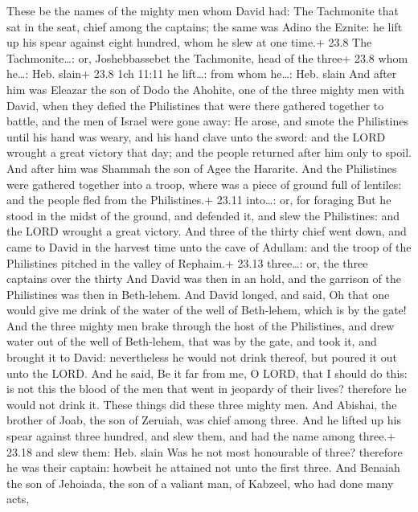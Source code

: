  These be the names of the mighty men whom David had: The
Tachmonite that sat in the seat, chief among the captains; the same was
Adino the Eznite: he lift up his spear against eight hundred, whom he
slew at one time.+ 23.8 The Tachmonite\ldots: or, Joshebbassebet the
Tachmonite, head of the three+ 23.8 whom he\ldots: Heb. slain+ 23.8 1ch
11:11 he lift\ldots: from whom he\ldots: Heb. slain  And
after him was Eleazar the son of Dodo the Ahohite, one of the three
mighty men with David, when they defied the Philistines that were there
gathered together to battle, and the men of Israel were gone away:
 He arose, and smote the Philistines until his hand was
weary, and his hand clave unto the sword: and the LORD wrought a great
victory that day; and the people returned after him only to spoil.
 And after him was Shammah the son of Agee the Hararite.
And the Philistines were gathered together into a troop, where was a
piece of ground full of lentiles: and the people fled from the
Philistines.+ 23.11 into\ldots: or, for foraging  But he
stood in the midst of the ground, and defended it, and slew the
Philistines: and the LORD wrought a great victory.  And
three of the thirty chief went down, and came to David in the harvest
time unto the cave of Adullam: and the troop of the Philistines pitched
in the valley of Rephaim.+ 23.13 three\ldots: or, the three captains
over the thirty  And David was then in an hold, and the
garrison of the Philistines was then in Beth-lehem.  And
David longed, and said, Oh that one would give me drink of the water of
the well of Beth-lehem, which is by the gate!  And the
three mighty men brake through the host of the Philistines, and drew
water out of the well of Beth-lehem, that was by the gate, and took it,
and brought it to David: nevertheless he would not drink thereof, but
poured it out unto the LORD.  And he said, Be it far from
me, O LORD, that I should do this: is not this the blood of the men that
went in jeopardy of their lives? therefore he would not drink it. These
things did these three mighty men.  And Abishai, the
brother of Joab, the son of Zeruiah, was chief among three. And he
lifted up his spear against three hundred, and slew them, and had the
name among three.+ 23.18 and slew them: Heb. slain  Was he
not most honourable of three? therefore he was their captain: howbeit he
attained not unto the first three.  And Benaiah the son of
Jehoiada, the son of a valiant man, of Kabzeel, who had done many acts,
